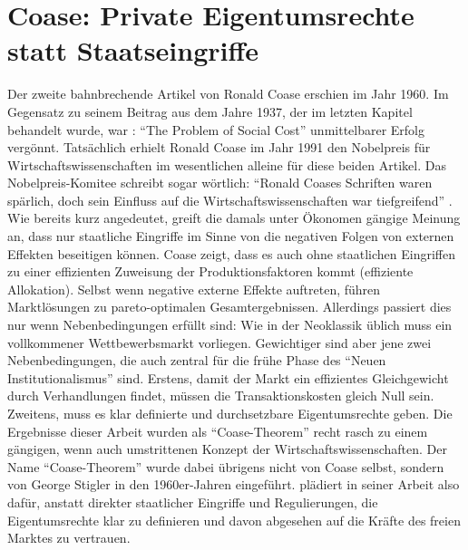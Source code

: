 \section{Coase: Private Eigentumsrechte statt Staatseingriffe}
\label{Coase-Theorem}

Der zweite bahnbrechende Artikel von Ronald Coase erschien im Jahr 1960. Im Gegensatz zu seinem Beitrag aus dem Jahre 1937, der im letzten Kapitel behandelt wurde, war \textcite{Coase1960}: "`The Problem of Social Cost"' unmittelbarer Erfolg vergönnt. Tatsächlich erhielt Ronald Coase im Jahr 1991 den Nobelpreis für Wirtschaftswissenschaften im wesentlichen alleine für diese beiden Artikel. Das Nobelpreis-Komitee schreibt sogar wörtlich: "`Ronald Coases Schriften waren spärlich, doch sein Einfluss auf die Wirtschaftswissenschaften war tiefgreifend"' \parencite{Coase1991a}. Wie bereits kurz angedeutet, greift \textcite[S. 1]{Coase1960} die damals unter Ökonomen gängige Meinung an, dass nur staatliche Eingriffe im Sinne von \textcite{Pigou1920} die negativen Folgen von externen Effekten beseitigen können. Coase zeigt, dass es auch ohne staatlichen Eingriffen zu einer effizienten Zuweisung der Produktionsfaktoren kommt (effiziente Allokation). Selbst wenn negative externe Effekte auftreten, führen Marktlösungen zu pareto-optimalen Gesamtergebnissen. Allerdings passiert dies nur wenn Nebenbedingungen erfüllt sind: Wie in der Neoklassik üblich muss ein vollkommener Wettbewerbsmarkt vorliegen. Gewichtiger sind aber jene zwei Nebenbedingungen, die auch zentral für die frühe Phase des "`Neuen Institutionalismus"' sind. Erstens, damit der Markt ein effizientes Gleichgewicht durch Verhandlungen findet, müssen die Transaktionskosten gleich Null sein. Zweitens, muss es klar definierte und durchsetzbare Eigentumsrechte geben. Die Ergebnisse dieser Arbeit wurden als "`Coase-Theorem"' recht rasch zu einem gängigen, wenn auch umstrittenen Konzept der Wirtschaftswissenschaften. Der Name "`Coase-Theorem"' wurde dabei übrigens nicht von Coase selbst, sondern von George Stigler \parencite{Coase1991} in den 1960er-Jahren eingeführt. \textcite{Coase1960} plädiert in seiner Arbeit also dafür, anstatt direkter staatlicher Eingriffe und Regulierungen, die Eigentumsrechte klar zu definieren und davon abgesehen auf die Kräfte des freien Marktes zu vertrauen. 

